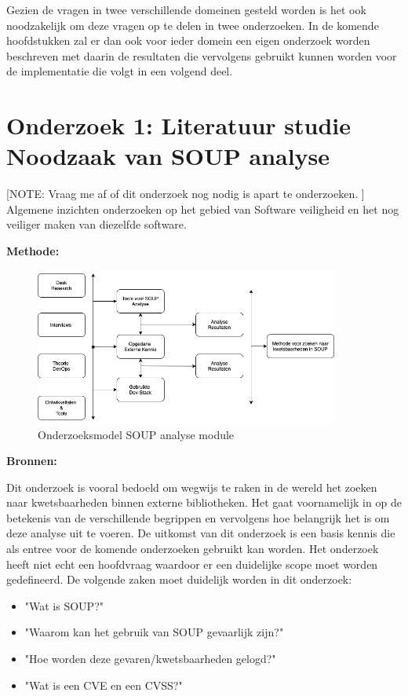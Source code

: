 Gezien de vragen in twee verschillende domeinen gesteld worden is het ook noodzakelijk om deze vragen op te delen in twee onderzoeken.
In de komende hoofdstukken zal er dan ook voor ieder domein een eigen onderzoek worden beschreven met daarin de resultaten die vervolgens gebruikt kunnen worden voor de implementatie die volgt in een volgend deel.
\section{Onderzoek 1: Literatuur studie Noodzaak van SOUP analyse}\label{sec:onderzoek:-literatuur-studie-soup}
[NOTE: Vraag me af of dit onderzoek nog nodig is apart te onderzoeken. ]
 Algemene inzichten onderzoeken op het gebied van Software veiligheid en het nog veiliger maken van diezelfde software.

\textbf{Methode: }

\begin{figure}[h!] %
  \myfloatalign
  \includegraphics[width=10cm]{gfx/OnderzoeksmodelSOUP}
  \caption{Onderzoeksmodel SOUP analyse module}
  \label{fig:OnderzoeksModelNoodZaakSOUP}
\end{figure}
\textbf{Bronnen: }

Dit onderzoek is vooral bedoeld om wegwijs te raken in de wereld het zoeken naar kwetsbaarheden binnen externe bibliotheken.
Het gaat voornamelijk in op de betekenis van de verschillende begrippen en vervolgens hoe belangrijk het is om deze analyse uit te voeren.
De uitkomst van dit onderzoek is een basis kennis die als entree voor de komende onderzoeken gebruikt kan worden.
Het onderzoek heeft niet echt een hoofdvraag waardoor er een duidelijke scope moet worden gedefineerd.
De volgende zaken moet duidelijk worden in dit onderzoek:
\begin{itemize}
  \item "Wat is SOUP?"
  \item "Waarom kan het gebruik van SOUP gevaarlijk zijn?"
  \item "Hoe worden deze gevaren/kwetsbaarheden gelogd?"
  \item "Wat is een CVE en een CVSS?"
\end{itemize}


